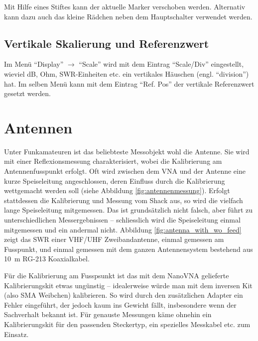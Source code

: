 \documentclass[twoside,a4paper,11pt,halfparskip,DIV=11,notitlepage]{scrartcl}
\begin{document}
Mit Hilfe eines Stiftes kann der aktuelle Marker verschoben werden. Alternativ kann dazu auch
das kleine Rädchen neben dem Hauptschalter verwendet werden.

\subsection{Vertikale Skalierung und Referenzwert}
Im Menü ``Display'' $\longrightarrow$ ``Scale'' wird mit dem Eintrag ``Scale/Div'' eingestellt,
wieviel dB, Ohm, SWR-Einheiten etc. ein vertikales Häuschen (engl. ``division'') hat. Im selben
Menü kann mit dem Eintrag ``Ref. Pos'' der vertikale Referenzwert gesetzt werden.

\newpage %
\section{Antennen}\label{sec:antennen}
Unter Funkamateuren ist das beliebteste Messobjekt wohl die Antenne. Sie wird mit einer
Reflexionsmessung charakterisiert, wobei die Kalibrierung am Antennenfusspunkt erfolgt. Oft
wird zwischen dem VNA und der Antenne eine kurze Speiseleitung angeschlossen, deren
Einfluss durch die Kalibrierung wettgemacht werden soll (siehe Abbildung \ref{fig:antennenmessung}).
Erfolgt stattdessen die Kalibrierung und Messung vom Shack aus, so wird die
vielfach lange Speiseleitung mitgemessen. Das ist grundsätzlich nicht falsch,
aber führt zu unterschiedlichen Messergebnissen -- schliesslich wird die
Speiseleitung einmal mitgemessen und ein andermal nicht. Abbildung
\ref{fig:antenna_with_wo_feed} zeigt das SWR einer VHF/UHF Zweibandantenne,
einmal gemessen am Fusspunkt, und einmal gemessen mit dem ganzen Antennensystem
bestehend aus 10~m RG-213 Koaxialkabel.

Für die Kalibrierung am Fusspsunkt ist das mit dem NanoVNA gelieferte Kalibrierungskit
etwas ungünstig -- idealerweise würde man mit dem inversen Kit (also SMA Weibchen)
kalibrieren. So wird durch den zusätzlichen Adapter ein Fehler eingeführt, der jedoch
kaum ins Gewicht fällt, insbesondere wenn der Sachverhalt bekannt ist. Für genauste
Messungen käme ohnehin ein Kalibrierungskit für den passenden Steckertyp, ein spezielles
Messkabel etc. zum Einsatz.
\end{document}

